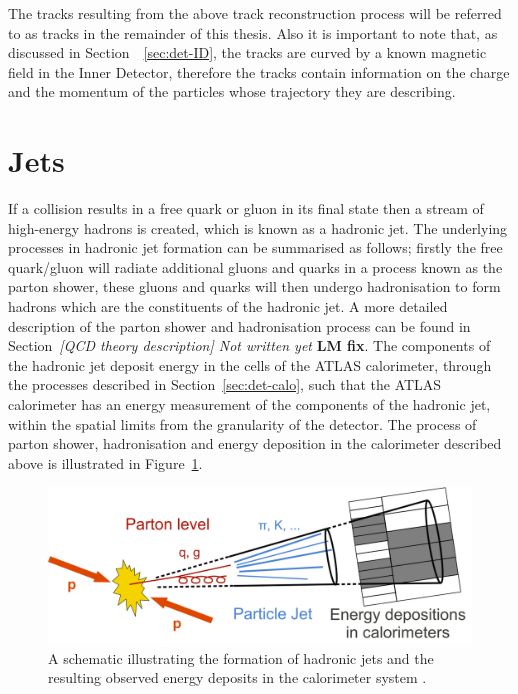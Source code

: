 The tracks resulting from the above track reconstruction process will be referred to as tracks in the remainder of this thesis.
Also it is important to note that, as discussed in Section~~\ref{sec:det-ID}, the tracks are curved by a known magnetic field in the Inner Detector,
therefore the tracks contain information on the charge and the momentum of the particles whose trajectory they are describing.

\section{Jets}
\label{sec:obj-jets}

If a collision results in a free quark or gluon in its final state then a stream of high-energy hadrons is created,
which is known as a hadronic jet.
The underlying processes in hadronic jet formation can be summarised as follows;
firstly the free quark/gluon will radiate additional gluons and quarks in a process known as the parton shower,
these gluons and quarks will then undergo hadronisation to form hadrons which are the constituents of the hadronic jet.
A more detailed description of the parton shower and hadronisation process can be found in Section~\textit{[QCD theory description] Not written yet} \textbf{LM fix}.
The components of the hadronic jet deposit energy in the cells of the ATLAS calorimeter, through the processes described in Section~\ref{sec:det-calo},
such that the ATLAS calorimeter has an energy measurement of the components of the hadronic jet, within the spatial limits from the granularity of the detector.
The process of parton shower, hadronisation and energy deposition in the calorimeter  described above is illustrated in Figure~\ref{fig:obj-jets_schem}.

\begin{figure}[!ht]
  \begin{center}
    \includegraphics[width=0.8\linewidth, angle=0]{figs/Objects/jets_schem.png}
  \end{center}
  \caption[A schematic illustrating the formation of hadronic jets and the resulting observed energy deposits in the calorimeter system.]
          {A schematic illustrating the formation of hadronic jets and the resulting observed energy deposits in the calorimeter system \cite{obj-jets_schem}.}
  \label{fig:obj-jets_schem}
\end{figure}

